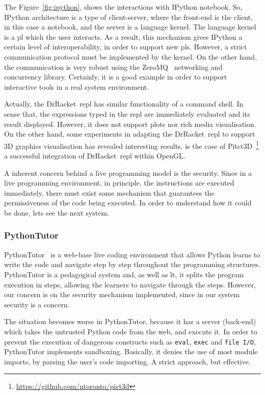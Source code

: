 The Figure~\ref{fig:ipython}, shows the interactions with IPython notebook. So, IPython architecture is a type of client-server, where the front-end is the client, in this case a notebook, and the server is a language kernel. The language kernel is a \ac{pl} which the user interacts. As a result, this mechanism gives IPython a certain level of interoperability, in order to support new \ac{pl}s. However, a strict communication protocol must be implemented by the kernel. On the other hand, the communication is very robust using the ZeroMQ~\cite{hintjens2013zeromq} networking and concurrency library. Certainly, it is a good example in order to support interactive tools in a real system environment.

Actually, the DrRacket~\ac{repl} has similar functionality of a command shell. In sense that, the expressions typed in the \ac{repl} are immediately evaluated and its result displayed. However, it does not support plots nor rich media visualisation. On the other hand, some experiments in adapting the DrRacket~\ac{repl} to support 3D graphics visualisation has revealed interesting results, is the case of Pitct3D~\footnote{\url{https://github.com/ntoronto/pict3d}} a successful integration of DrRacket~\ac{repl} within OpenGL.

A inherent concern behind a live programming model is the security. Since in a live programming environment, in principle, the instructions are executed immediately, there must exist some mechanism that guarantees the permissiveness of the code being executed. In order to understand how it could be done, lets see the next system. 

\subsubsection{PythonTutor}

PythonTutor~\cite{GuoSIGCSE2013} is a web-base live coding environment that allows Python learns to write the code and navigate step by step throughout the programming structures. PythonTutor is a pedagogical system and, as well as \ac{lt}, it splits the program execution in steps, allowing the learners to navigate through the steps. However, our concern is on the security mechanism implemented, since in our system security is a concern.

The situation becomes worse in PythonTutor, because it has a server (back-end) which takes the untrusted Python code from the web, and execute it. In order to prevent the execution of dangerous constructs such as {\tt eval}, {\tt exec} and {\tt file I/O},  PythonTutor implements sandboxing. Basically, it denies the use of most module imports, by parsing the user's code importing. A strict approach, but effective.

